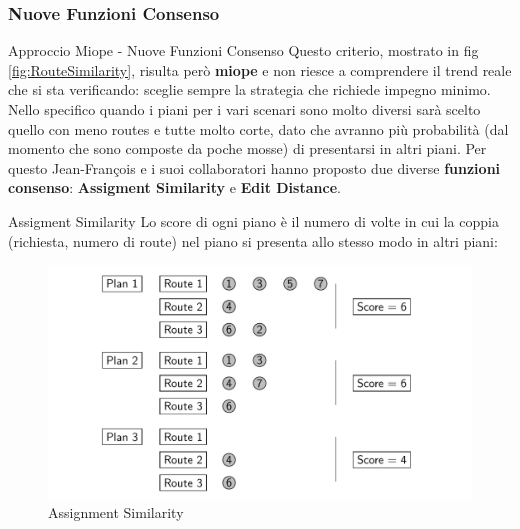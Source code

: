 \documentclass[10pt]{beamer}
\begin{document}
    \subsubsection{Nuove Funzioni Consenso}
    \begin{frame}{Approccio Miope - Nuove Funzioni Consenso}
        Questo criterio, mostrato in fig \ref{fig:RouteSimilarity}, risulta però \textbf{miope} e non riesce a comprendere il trend reale che si sta verificando: sceglie sempre la strategia che richiede impegno minimo. Nello specifico quando i piani per i vari scenari sono molto diversi sarà scelto quello con meno routes e tutte molto corte, dato che avranno più probabilità (dal momento che sono composte da poche mosse) di presentarsi in altri piani. Per questo Jean-François e i suoi collaboratori hanno proposto due diverse \textbf{funzioni consenso}: \textbf{Assigment Similarity} e \textbf{Edit Distance}.
    \end{frame}

    \begin{frame}{Assigment Similarity}
         Lo score di ogni piano è il numero di volte in cui la coppia (richiesta, numero di route) nel piano si presenta allo stesso modo in altri piani:
        \begin{figure}[h!]
            \centering
            \includegraphics[scale=0.25]{Images/AssignmentSimilarity.png}
            \caption{Assignment Similarity}
            \label{fig:AssignmentSimilarity}
        \end{figure}
    \end{frame}
\end{document}
